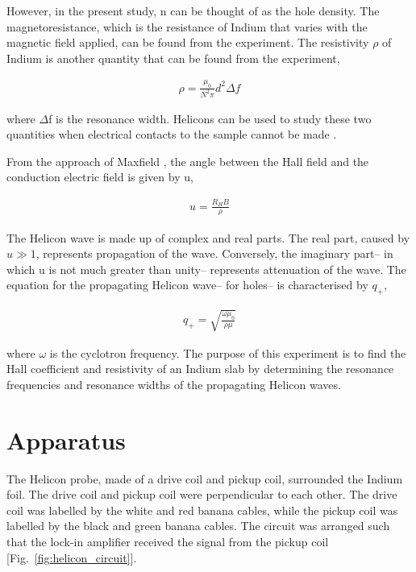However, in the present study, n can be thought of as the hole density. The magnetoresistance, which is the resistance of Indium that varies with the magnetic field applied, can be found from the experiment. The resistivity $\rho$ of Indium is another quantity that can be found from the experiment,

\begin{align} \label{eq:resistivity}
\rho = \frac{\mu_0}{N^2\pi}d^2 \Delta f
\end{align}

where $\Delta$f is the resonance width. Helicons can be used to study these two quantities when electrical contacts to the sample cannot be made \cite{c1}.
\vspace{2mm}

From the approach of Maxfield \cite{c6}, the angle between the Hall field and the conduction electric field is given by u, 

\begin{align} \label{eq:tangent}
u = \frac{R_H B}{\rho}
\end{align}

The Helicon wave is made up of complex and real parts. The real part, caused by $u \gg 1$, represents propagation of the wave. Conversely, the imaginary part-- in which u is not much greater than unity-- represents attenuation of the wave. The equation for the propagating Helicon wave-- for holes-- is characterised by $q_{+}$, 

\begin{align} \label{eq:holewave}
q_{+} = \sqrt{\frac{\omega \mu_0}{\rho \mu}}
\end{align}

where $\omega$ is the cyclotron frequency. The purpose of this experiment is to find the Hall coefficient and resistivity of an Indium slab by determining the resonance frequencies and resonance widths of the propagating Helicon waves. 

\section{Apparatus}
The Helicon probe, made of a drive coil and pickup coil, surrounded the Indium foil. The drive coil and pickup coil were perpendicular to each other. The drive coil was labelled by the white and red banana cables, while the pickup coil was labelled by the black and green banana cables. The circuit was arranged such that the lock-in amplifier received the signal from the pickup coil [Fig.~\ref{fig:helicon_circuit}]. 
\vspace{2mm}

